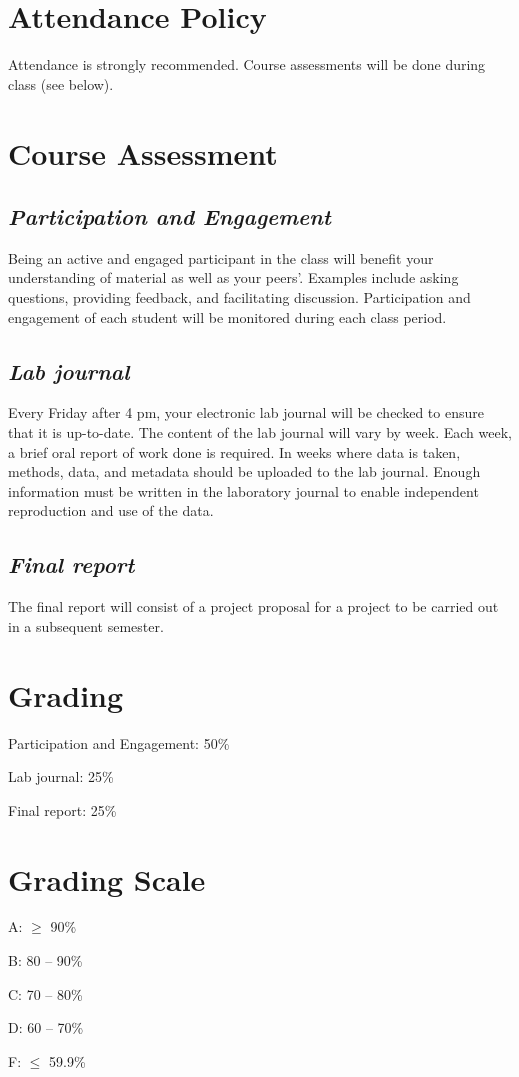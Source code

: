 \documentclass[12pt, notitlepage]{article}   	%
\begin{document}
{\section{Attendance Policy}
Attendance is strongly recommended. 
Course assessments will be done during class (see below).

\section{Course Assessment}
\subsection{\textit{Participation and Engagement}}
Being an active and engaged participant in the class will benefit your understanding
of material as well as your peers'. Examples include asking questions, providing feedback,
and facilitating discussion. Participation and engagement of each student will be monitored
during each class period.

\subsection{\textit{Lab journal}}
Every Friday after 4 pm, your electronic lab journal will be checked to ensure that it 
is up-to-date. The content of the lab journal will vary by week. 
Each week, a brief oral report of work done is required. 
In weeks where data is taken, methods, data, and metadata 
should be uploaded to the lab journal. Enough information must be written in the 
laboratory journal to enable independent reproduction and use of the data.

\subsection{\textit{Final report}}
The final report will consist of a project proposal for a project to be carried out 
in a subsequent semester.

\section{Grading}
Participation and Engagement: 50\% \par
Lab journal: 25\% \par
Final report: 25\% \par

\section{Grading Scale}
A: $\geq$ 90\% \par
B: 80 – 90\% \par
C: 70 – 80\% \par
D: 60 – 70\% \par
F: $\leq$ 59.9\% \par

}
\end{document}
